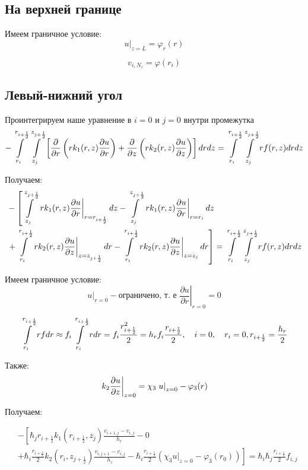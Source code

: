 \subsection{На верхней границе}
Имеем граничное условие:
\[
  \left . u \right \vert_{z=L} = \varphi_r(r) 
\]

\[
  v_{i,N_z} = \varphi(r_i)
\]

\subsection{Левый-нижний угол}

Проинтегрируем наше уравнение в $ i = 0 $ и $ j = 0 $ внутри промежутка
\[
  - \int\limits^{r_{i +\frac{1}{2}}}_{r_{i }} \int\limits^{z_{j +\frac{1}{2}}}_{z_{j }} \left [ \pdv{}{r} \left ( r k_1(r, z) \pdv{u}{r} \right ) 
  + \pdv{}{z} \left ( rk_2(r, z)\pdv{u}{z} \right ) \right ] dr dz = \int\limits^{r_{i +\frac{1}{2}}}_{r_{i }} \int\limits^{z_{j +\frac{1}{2}}}_{z_{j }} rf(r, z) dr dz
\]

Получаем:
\begin{align*}
  &- \left [
   \int\limits^{z_{j +\frac{1}{2}}}_{z_{j }}  \left . r k_1(r, z) \pdv{u}{r} \right \vert_{r = r_{i + \frac{1}{2}}} dz
  - \int\limits^{z_{j +\frac{1}{2}}}_{z_{j }} \left . r k_1(r, z) \pdv{u}{r} \right \vert_{r = r_{i}} dz
  \right . \\
  &\left . + \int\limits^{r_{i+\frac{1}{2}}}_{r_{i}} \left . rk_2(r, z)\pdv{u}{z} \right \vert_{z = z_{j + \frac{1}{2}}} dr
  - \int\limits^{r_{i+\frac{1}{2}}}_{r_{i}} \left . rk_2(r, z)\pdv{u}{z} \right \vert_{z = z_{j}} dr
  \right ] = \int\limits^{r_{i +\frac{1}{2}}}_{r_{i }} \int\limits^{z_{j +\frac{1}{2}}}_{z_{j }} rf(r, z) dr dz
\end{align*}

Имеем граничное условие:
\[
  \left . u \right \vert_{r=0} - \text{ограничено, т. е } \left . \frac{\partial u}{ \partial r} \right |_{r = 0} = 0
\]

\[
  \int\limits^{r_{i+ \frac{1}{2}}}_{r_{i}} rf dr \approx f_i \int\limits^{r_{i + \frac{1}{2}}}_{r_{i}} r dr = 
  f_i \frac{r^2_{i + \frac{1}{2}}}{2} = h_r f_i \frac{r_{i + \frac{1}{2}}}{2},
  \quad i = 0, \quad r_i = 0, r_{i + \frac{1}{2}} = \frac{h_r}{2}
\]

Также:
\[
  \left . k_2 \pdv{u}{z} \right \vert_{z=0} = \chi_3 \left . u \right \vert_{z=0} - \varphi_3(r) 
\]

Получаем:

\begin{align*}
  &- \left [ 
  \hbar_j r_{i+\frac{1}{2}} k_1(r_{i+\frac{1}{2}}, z_j) \frac{v_{i+1, j} - v_{i, j}}{h_{r}}
  - 0
  \right . \\
  &\left .
  + \hbar_i \frac{r_{i + \frac{1}{2}}}{2} k_2(r_i, z_{j+\frac{1}{2}}) \frac{v_{i, j + 1} - v_{i, j}}{h_{z}}
  - \hbar_i \frac{r_{i + \frac{1}{2}}}{2} (\chi_3 \left . u \right \vert_{z=0} - \varphi_3(r_0))
  \right ]  = \hbar_i \hbar_j \frac{r_{i + \frac{1}{2}}}{2} f_{i, j}
\end{align*}

